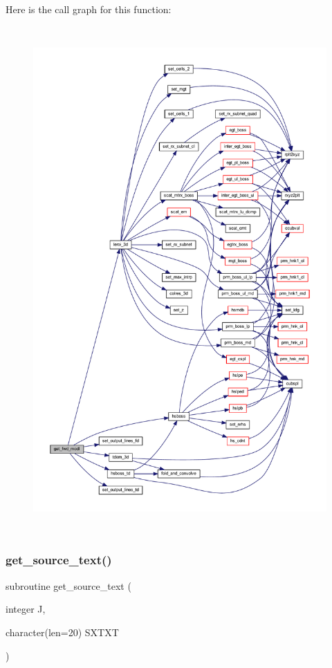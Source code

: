 Here is the call graph for this function\+:\nopagebreak
\begin{figure}[H]
\begin{center}
\leavevmode
\includegraphics[height=550pt]{Leroi__c_8f90_a38a723748e0c805e5dfbd851b9c62b3e_cgraph}
\end{center}
\end{figure}
\mbox{\label{Leroi__c_8f90_afc048db626c18fa128abba7a8c2100f6}} 
\subsubsection{\texorpdfstring{get\+\_\+source\+\_\+text()}{get\_source\_text()}}
{\footnotesize\ttfamily subroutine get\+\_\+source\+\_\+text (\begin{DoxyParamCaption}\item[{integer}]{J,  }\item[{character(len=20)}]{S\+X\+T\+XT }\end{DoxyParamCaption})}

